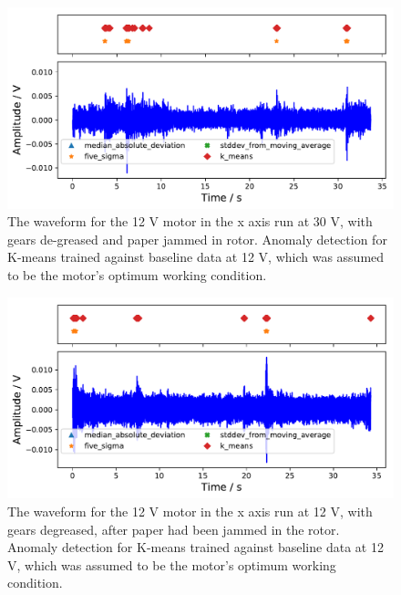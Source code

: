 



\begin{figure}[t]
    \includegraphics[width=1.0\textwidth]{fig/WD40_dry_dirt_12V_motornorm12V.pdf}
    \caption[Anomaly Tests 30 V Motor with Paper Jam]{The waveform for the 12 V motor in the x axis run at 30 V, with gears de-greased and paper jammed in rotor. Anomaly detection for K-means trained against baseline data at 12 V, which was assumed to be the motor's optimum working condition.}
    \label{fig:12V_paper}
\end{figure}

\begin{figure}[t]
    \includegraphics[width=1.0\textwidth]{fig/WD40_after_paper_12V_motornorm12V.pdf}
    \caption[Anomaly Tests 12 V Motor after Paper Jam]{The waveform for the 12 V motor in the x axis run at 12 V, with gears degreased, after paper had been jammed in the rotor. Anomaly detection for K-means trained against baseline data at 12 V, which was assumed to be the motor's optimum working condition.}
    \label{fig:12V_afterpaper}
\end{figure}


